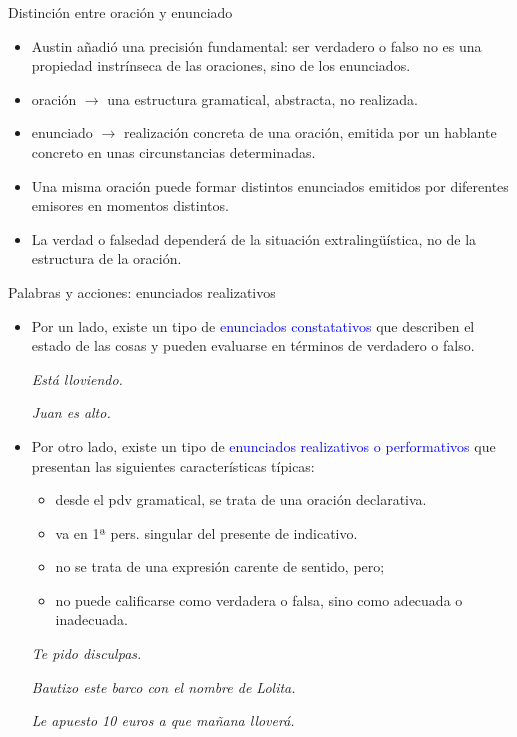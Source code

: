 \documentclass{beamer}
\begin{document}
\begin{frame}{Distinción entre oración y enunciado}

\begin{itemize}
	\item Austin añadió una precisión fundamental: ser verdadero o falso no es una propiedad instrínseca de las oraciones, sino de los enunciados. 
	\item oración $\rightarrow$ una estructura gramatical, abstracta, no realizada.
	\item enunciado $\rightarrow$ realización concreta de una oración, emitida por un hablante concreto en unas circunstancias determinadas.
	\item Una misma oración puede formar distintos enunciados emitidos por diferentes emisores en momentos distintos.
	\item La verdad o falsedad dependerá de la situación extralingüística, no de la estructura de la oración.
\end{itemize}

\end{frame}

\begin{frame}{Palabras y acciones: enunciados realizativos}

\begin{itemize}
	\item Por un lado, existe un tipo de \textcolor{blue}{enunciados constatativos} que describen el estado de las cosas y pueden evaluarse en términos de verdadero o falso.

	\it{Está lloviendo.}

	\it{Juan es alto.}

	\item Por otro lado, existe un tipo de \textcolor{blue}{enunciados realizativos o performativos} que presentan las siguientes características típicas:
	\begin{itemize}
		\item desde el pdv gramatical, se trata de una oración declarativa.
		\item va en 1ª pers. singular del presente de indicativo.
		\item no se trata de una expresión carente de sentido, pero;
		\item no puede calificarse como verdadera o falsa, sino como adecuada o inadecuada.
	\end{itemize}
	
	\it{Te pido disculpas.}

	\it{Bautizo este barco con el nombre de Lolita.}

	\it{Le apuesto 10 euros a que mañana lloverá.}
\end{itemize}

\end{frame}
\end{document}
